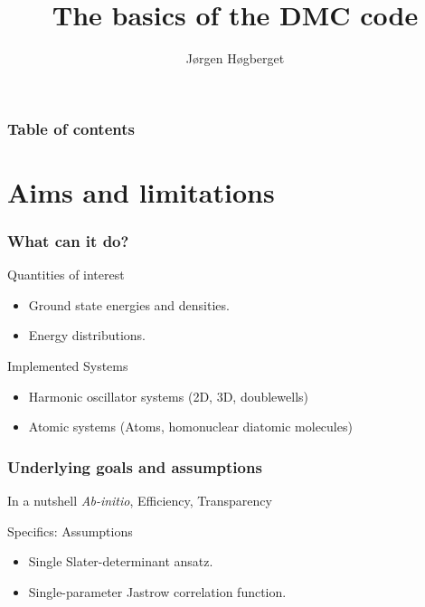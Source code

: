 \documentclass{beamer}
\begin{document}
\title{The basics of the DMC code}
\author{Jørgen Høgberget}
\date{} 

\begin{frame}
\titlepage
\end{frame}

\begin{frame}\frametitle{Table of contents}\tableofcontents
\end{frame} 


\section{Aims and limitations} 
\begin{frame}\frametitle{What can it do?} 

\begin{alertblock}{Quantities of interest}
\begin{itemize}
 \item Ground state energies and densities.
 \item Energy distributions.
\end{itemize}
\end{alertblock}

\pause
\begin{alertblock}{Implemented Systems}
\begin{itemize}
\item Harmonic oscillator systems (2D, 3D, doublewells)
\item Atomic systems (Atoms, homonuclear diatomic molecules)
\end{itemize}
\end{alertblock}

\end{frame}

\begin{frame}\frametitle{Underlying goals and assumptions}

\begin{alertblock}{In a nutshell}
 \textit{Ab-initio}, Efficiency, Transparency
\end{alertblock}

\pause

\begin{alertblock}{Specifics: Assumptions}
\begin{itemize}
 \item Single Slater-determinant ansatz.
 \item Single-parameter Jastrow correlation function.
\end{itemize}
\end{alertblock}

\end{frame}
\end{document}
